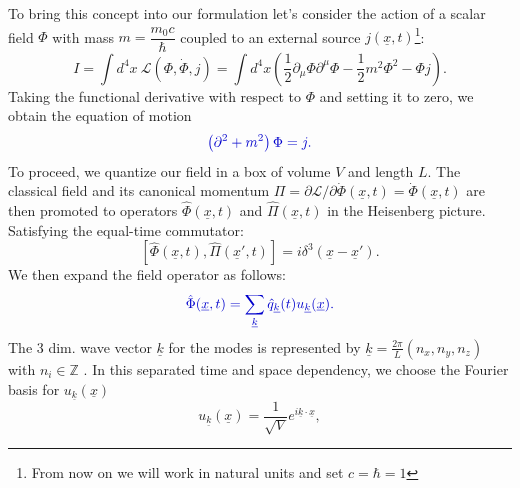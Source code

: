 \documentclass[12pt, titlepage]{article}
\begin{document}
To bring this concept into our formulation let's consider 
the action of a scalar field $ \Phi $ with mass $ m=\dfrac{m_{0}c}{\hbar} $ coupled to an external source $ j(\underline{x},t) $\footnote{From now on we will work in natural units and set $ c=\hbar=1 $ }:
\begin{equation}
I=\int d^{4}x \ \mathcal{L}(\Phi, \dot{\Phi},j)=
\int d^{4}x 
\left(
\frac{1}{2}\partial_{\mu}\Phi\partial^{\mu}\Phi
-\frac{1}{2}m^{2}\Phi^{2}
-\Phi j
 \right)
 .
\end{equation}
Taking the functional derivative with respect to $ \Phi $ and setting it to zero, we obtain the equation of motion
\begin{equation}\label{motion_scalar}
\textcolor[RGB]{0,0,204}{
\left(
\partial^{2}+m^{2}
 \right)\Phi
 =j
 .}
\end{equation}
To proceed, we quantize our field in a box of volume $ V $ and length $ L $. The classical field and its canonical momentum $ \Pi = \partial \mathcal{L} /\partial\dot{\Phi}(\underline{x},t)=\dot{\Phi}(\underline{x},t) $ are then promoted to operators $ \hat{\Phi}(\underline{x},t) $ and  $ \hat{\Pi}(\underline{x},t) $ in the Heisenberg picture. Satisfying the equal-time commutator:
\begin{equation}
\left[
\hat{\Phi}(\underline{x},t),\hat{\Pi}(\underline{x}',t)
 \right] 
 =
 i
 \delta^{3}
 (\underline{x} - \underline{x}')
 .
\end{equation}
We then expand the field operator as follows:
\begin{equation}\label{box_quanta}
\textcolor[RGB]{0,0,204}{
\hat{\Phi} (\underline{x},t)= \sum_{\underline{k}} \hat{q}_{\underline{k}}(t)u_{\underline{k}}(\underline{x})
 .}
\end{equation}
The 3 dim. wave vector $ \underline{k} $ for the modes is represented by $ \underline{k} = \frac{2\pi}{L}(n_{x},n_{y},n_{z}) $ with $ n_{i}\in \mathbb{Z} $ . 
	In this separated time and space dependency, we choose the Fourier basis for $ u_{\underline{k}}(\underline{x}) $
\begin{equation}\label{fourierbasis}
u_{\underline{k}}(\underline{x})
=
\dfrac{1}{\sqrt{V}} e^{i\underline{k}\cdot \underline{x}}
,
\end{equation}
\end{document}
